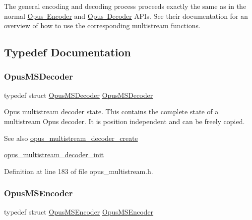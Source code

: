 The general encoding and decoding process proceeds exactly the same as in the normal \mbox{\hyperlink{group__opus__encoder}{Opus Encoder}} and \mbox{\hyperlink{group__opus__decoder}{Opus Decoder}} A\+P\+Is. See their documentation for an overview of how to use the corresponding multistream functions. 

\subsection{Typedef Documentation}
\mbox{\label{group__opus__multistream_gad3497495deb9a8ace82e76cd4f93e0e4}} 
\subsubsection{\texorpdfstring{OpusMSDecoder}{OpusMSDecoder}}
{\footnotesize\ttfamily typedef struct \mbox{\hyperlink{group__opus__multistream_gad3497495deb9a8ace82e76cd4f93e0e4}{Opus\+M\+S\+Decoder}} \mbox{\hyperlink{group__opus__multistream_gad3497495deb9a8ace82e76cd4f93e0e4}{Opus\+M\+S\+Decoder}}}

Opus multistream decoder state. This contains the complete state of a multistream Opus decoder. It is position independent and can be freely copied. \begin{DoxySeeAlso}{See also}
\mbox{\hyperlink{group__opus__multistream_ga0dc5378a3d4c65498cf530e450b56aa1}{opus\+\_\+multistream\+\_\+decoder\+\_\+create}} 

\mbox{\hyperlink{group__opus__multistream_gac9680d4205a5ea95785e747f0d2e393b}{opus\+\_\+multistream\+\_\+decoder\+\_\+init}} 
\end{DoxySeeAlso}


Definition at line 183 of file opus\+\_\+multistream.\+h.

\mbox{\label{group__opus__multistream_gae5826674d142fc873ebc1d781c507dd7}} 
\subsubsection{\texorpdfstring{OpusMSEncoder}{OpusMSEncoder}}
{\footnotesize\ttfamily typedef struct \mbox{\hyperlink{group__opus__multistream_gae5826674d142fc873ebc1d781c507dd7}{Opus\+M\+S\+Encoder}} \mbox{\hyperlink{group__opus__multistream_gae5826674d142fc873ebc1d781c507dd7}{Opus\+M\+S\+Encoder}}}

